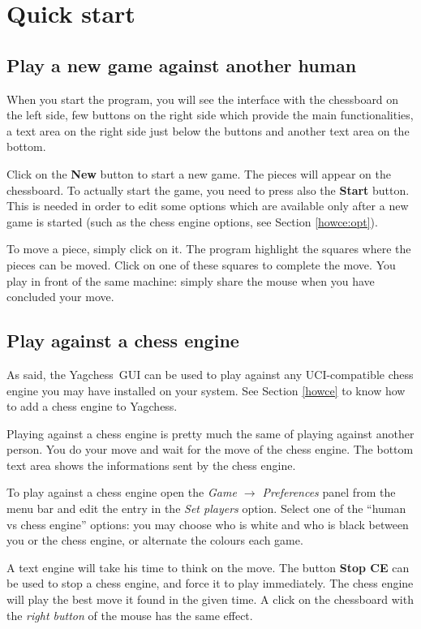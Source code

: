 \documentclass[a4paper]{article}
\newcommand{\nameprog}{Yagchess}
\begin{document}
\section{Quick start}
\label{quick}
\subsection{Play a new game against another human}
When you start the program, you will see the interface with the chessboard on the left side, few buttons on the right side which provide the main functionalities,
a text area on the right side just below the buttons and another text area on the bottom.

Click on the \textbf{New} button to start a new game. The pieces will appear on the chessboard. To actually start the game, you need to press also the \textbf{Start} button.
This is needed in order to edit some options which are available only after a new game is started (such as the chess engine options, see Section \ref{howce:opt}).

To move a piece, simply click on it. The program highlight the squares where the pieces can be moved. Click on one of these squares to complete the move.
You play in front of the same machine: simply share the mouse when you have concluded your move.


\subsection{Play against a chess engine}
As said, the \nameprog\ GUI can be used to play against any UCI-compatible chess engine you may have installed on your system. See
Section \ref{howce} to know how to add a chess engine to \nameprog.

Playing against a chess engine is pretty much the same of playing against another person. You do your move and wait for the move of the chess engine.
The bottom text area shows the informations sent by the chess engine.

To play against a chess engine open the \textit{Game $\rightarrow$ Preferences} panel from the menu bar and edit the entry in the \textit{Set players} option. Select one of
the ``human vs chess engine'' options: you may choose who is white and who is black between you or the chess engine, or alternate the colours each game.

A text engine will take his time to think on the move. The button \textbf{Stop CE} can be used to stop a chess engine, and force it to play immediately.
The chess engine will play the best move it found in the given time. A click on the chessboard with the \textit{right button} of the mouse has the same effect.
\end{document}
